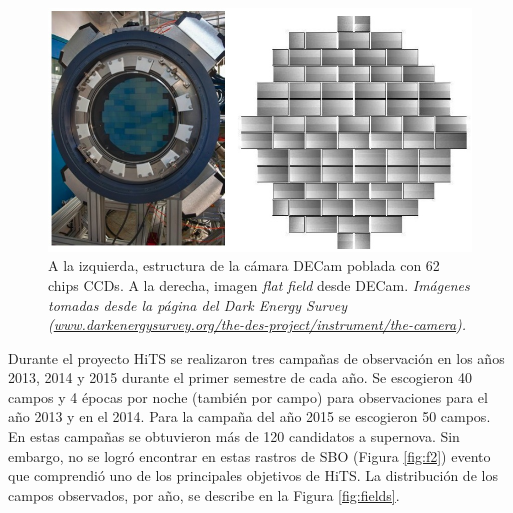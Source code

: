 \begin{figure}[h!]
\centering
\includegraphics[scale=.5]{images/CCDs.jpg}
\caption{A la izquierda, estructura de la c\'amara DECam poblada con 62 chips CCDs. A la derecha, imagen \textit{flat field} desde DECam. \textit{Im\'agenes tomadas desde la p\'agina del Dark Energy Survey (\url{www.darkenergysurvey.org/the-des-project/instrument/the-camera}).}}
\label{fig:f3}
\end{figure}

Durante el proyecto HiTS se realizaron tres campa\~nas de observaci\'on en los a\~nos 2013, 2014 y 2015 durante el primer semestre de cada a\~no. Se escogieron 40 campos y 4 \'epocas por noche (tambi\'en por campo) para observaciones para el a\~no 2013 y en el 2014. Para la campa\~na del a\~no 2015 se escogieron 50 campos. En estas campa\~nas se obtuvieron m\'as de 120 candidatos a supernova. Sin embargo, no se logr\'o encontrar en estas rastros de SBO (Figura \ref{fig:f2}) evento que comprendi\'o uno de los principales objetivos de HiTS. La distribuci\'on de los campos observados, por a\~no, se describe en la Figura \ref{fig:fields}. 

